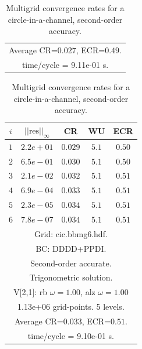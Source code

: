 \begin{table}[hbt]
\begin{center}
{\begin{tabular}{|c|c|c|c|c|}
\multicolumn{5}{|c|}{Average CR=$0.027$, ECR=$0.49$.}  \\
\multicolumn{5}{|c|}{time/cycle = 9.11e-01 s.}  \\
\hline 
\end{tabular}
\begin{tabular}{|c|c|c|c|c|} \hline 
 $i$   & $\vert\vert\mbox{res}\vert\vert_\infty$  &  CR     &  WU    & ECR  \\   \hline 
 $ 1$  & $ 2.2e+01$ & $0.029$ & $ 5.1$ & $0.50$ \\ 
 $ 2$  & $ 6.5e-01$ & $0.030$ & $ 5.1$ & $0.50$ \\ 
 $ 3$  & $ 2.1e-02$ & $0.032$ & $ 5.1$ & $0.51$ \\ 
 $ 4$  & $ 6.9e-04$ & $0.033$ & $ 5.1$ & $0.51$ \\ 
 $ 5$  & $ 2.3e-05$ & $0.034$ & $ 5.1$ & $0.51$ \\ 
 $ 6$  & $ 7.8e-07$ & $0.034$ & $ 5.1$ & $0.51$ \\ 
\hline 
\multicolumn{5}{|c|}{Grid: cic.bbmg6.hdf.}  \\
\multicolumn{5}{|c|}{BC: DDDD+PPDI.}  \\
\multicolumn{5}{|c|}{Second-order accurate.}  \\
\multicolumn{5}{|c|}{Trigonometric solution.}  \\
\multicolumn{5}{|c|}{V[2,1]: rb $\omega=1.00$, alz $\omega=1.00$}  \\
\multicolumn{5}{|c|}{1.13e+06 grid-points. 5 levels.}  \\
\multicolumn{5}{|c|}{Average CR=$0.033$, ECR=$0.51$.}  \\
\multicolumn{5}{|c|}{time/cycle = 9.10e-01 s.}  \\
\hline 
\end{tabular}
} %
\end{center}
\caption{Multigrid convergence rates for a circle-in-a-channel, second-order accuracy.}
\end{table}




